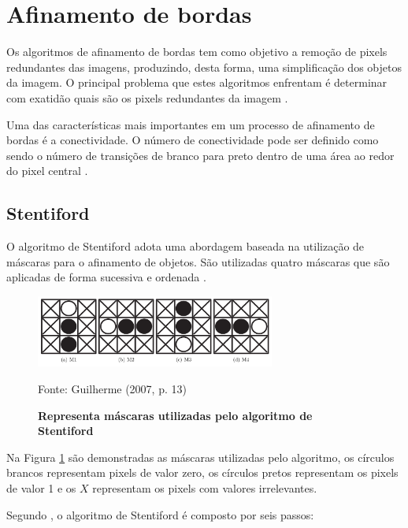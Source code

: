 \documentclass[
	12pt,				%
	oneside,			%
	a4paper,			%
	english,			%
	french,				%
	spanish,			%
	brazil,				%
	]{abntex2}
\begin{document}
\section{Afinamento de bordas}    

Os algoritmos de afinamento de bordas tem como objetivo a remoção de pixels redundantes das imagens, produzindo, desta forma, uma simplificação dos objetos da imagem. O principal problema que estes algoritmos enfrentam é determinar com exatidão quais são os pixels redundantes da imagem \cite{guilherme:2007}.

Uma das características mais importantes em um processo de afinamento de bordas é a conectividade. O número de conectividade pode ser definido como sendo o número de transições de branco para preto dentro de uma área ao redor do pixel central \cite{guilherme:2007}.
    
\subsection{Stentiford}    

O algoritmo de Stentiford adota uma abordagem baseada na utilização de máscaras para o afinamento de objetos. São utilizadas quatro máscaras que são aplicadas de forma sucessiva e ordenada \cite{guilherme:2007}.

\begin{figure}[ht]
\centering
\caption{\textbf{Representa máscaras utilizadas pelo algoritmo de Stentiford}}
\includegraphics[width=0.7\textwidth]{imagens/stentiford.png}

Fonte: Guilherme (2007, p. 13)
\label{fig:stentiford}
\end{figure}

Na Figura \ref{fig:stentiford} são demonstradas as máscaras utilizadas pelo algoritmo, os círculos brancos representam pixels de valor zero, os círculos pretos representam os pixels de valor 1 e os \(X\) representam os pixels com valores irrelevantes.

Segundo \citet{guilherme:2007}, o algoritmo de Stentiford é composto por seis passos:
\end{document}

